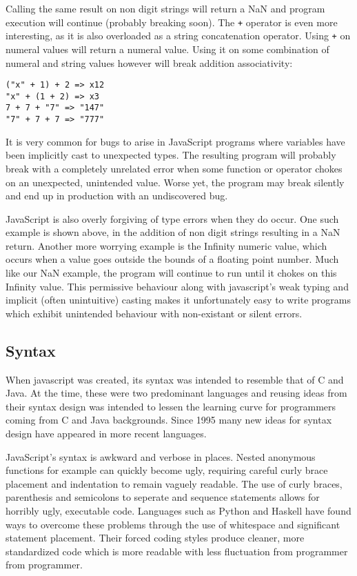 \noindent Calling the same result on non digit strings will return a NaN and
program execution will continue (probably breaking soon). The \verb!+! operator
is even more interesting, as it is also overloaded as a string concatenation
operator. Using \verb!+! on numeral values will return a numeral value. 
Using it on some combination of numeral and string values however will break
addition associativity:

\begin{center}
	\verb!("x" + 1) + 2 => x12! \\
	\verb!"x" + (1 + 2) => x3! \\
	\verb!7 + 7 + "7" => "147"! \\
	\verb!"7" + 7 + 7 => "777"!
\end{center}

\noindent It is very common for bugs to arise in JavaScript programs where
variables have been implicitly cast to unexpected types. The
resulting program will probably break with a completely unrelated error
when some function or operator chokes on an unexpected, unintended value.
Worse yet, the program may break silently and end up in production with 
an undiscovered bug.

JavaScript is also overly forgiving of type errors when they do occur.
One such example is shown above, in the addition of non digit strings
resulting in a NaN return. Another more worrying example is the Infinity
numeric value, which occurs when a value goes outside the bounds of
a floating point number. Much like our NaN example, the program will
continue to run until it chokes on this Infinity value. This permissive
behaviour along with javascript's weak typing and implicit (often unintuitive)
casting makes it unfortunately easy to write programs which exhibit
unintended behaviour with non-existant or silent errors.
 


\subsection{Syntax}
When javascript was created, its syntax was intended to resemble that 
of C and Java. At the time, these were two predominant languages and
reusing ideas from their syntax design was intended to lessen the 
learning curve for programmers coming from C and Java backgrounds.
Since 1995 many new ideas for syntax design have appeared in more
recent languages. 

JavaScript's syntax is awkward and verbose in places. Nested 
anonymous functions for example can quickly become ugly, requiring
careful curly brace placement and indentation to remain vaguely
readable. The use of curly braces, parenthesis and semicolons to
seperate and sequence statements allows for horribly ugly, executable
code. Languages such as Python and Haskell have found ways
to overcome these problems through the use of whitespace and significant
statement placement. Their forced coding styles produce cleaner, more
standardized code which is more readable with less fluctuation from
programmer from programmer. 


